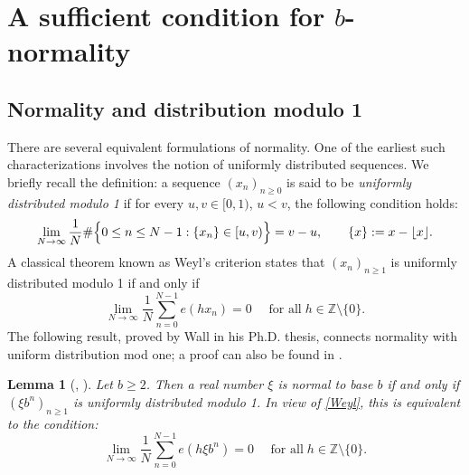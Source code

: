 \documentclass[12pt, twoside]{article}
\newtheorem{lemma}[theorem]{Lemma}
\theoremstyle{definition}
\numberwithin{equation}{section}
\begin{document}
\section{A sufficient condition for $b$-normality}  \label{normality-overview-section} 
\subsection{Normality and distribution modulo 1} \label{unif-dist-section}
There are several equivalent formulations of normality. One of the earliest such characterizations involves the notion of uniformly distributed sequences. We briefly recall the definition:  a sequence $(x_n)_{n \geq 0}$ is said to be {\em{uniformly distributed modulo 1}} if for every $u, v \in [0, 1)$, $u < v$, the following condition holds:
\[ \lim_{N \rightarrow \infty} \frac{1}{N} \# \Bigl\{0 \leq n \leq N-1: \{x_n \} \in [u, v) \Bigr\} = v - u, \qquad \{x\} := x - \lfloor x \rfloor. \]
A classical theorem known as Weyl's criterion \cite[Theorem 1.2]{b12} states that $(x_n)_{n \geq 1}$ is uniformly distributed modulo 1 if and only if 
\begin{equation} \label{Weyl}
\lim_{N \rightarrow \infty} \frac{1}{N} \sum_{n=0}^{N-1} e(h x_n)  = 0 \quad \text{ for all}\; h \in \mathbb{Z}\setminus\{0\}. 
\end{equation}   
The following result, proved by Wall \cite{w49} in his Ph.D. thesis, connects normality with uniform distribution mod one; a proof can also be found in \cite[Theorem 4.14]{b12}. 
\begin{lemma}[\cite{w49}, {\cite[Theorem 4.14]{b12}}] \label{Weyl-lemma} 
Let $b \geq 2$. Then a real number $\xi$ is normal to base $b$ if and only if $(\xi b^n)_{n \geq 1}$ is uniformly distributed modulo 1. In view of \eqref{Weyl}, this is equivalent to the condition:
\begin{equation} \label{Weyl-2} 
\lim_{N \rightarrow \infty} \frac{1}{N} \sum_{n=0}^{N-1} e(h \xi b^n)  = 0 \quad \text{ for all}\; h \in \mathbb{Z}\setminus\{0\}.
\end{equation}  
\end{lemma}  
\end{document}

